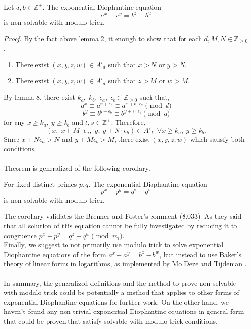 \documentclass[12pt]{article}
\begin{document}
\begin{theorem}
Let $a,b \in \mathbb{Z}^+$. The exponential Diophantine equation
    \[a^x-a^y = b^z-b^w \]
    is non-solvable with modulo trick.
\end{theorem}
\noindent
\textit{Proof}. By the fact above lemma 2, it enough to show that for each $d,M,N \in \mathbb{Z}_{\geq 0}$,
\begin{enumerate}
    \item There exist $(x,y,z,w) \in A'_d$ such that $x > N$ or $y > N$.
    \item There exist $(x,y,z,w) \in A'_d$ such that $z > M$ or $w > M$.
\end{enumerate}
By lemma 8, there exist $k_a,\;k_b,\;\epsilon_a,\;\epsilon_b \in \mathbb{Z}_{\geq 0 }$ such that,
\[a^x \equiv a^{x+\epsilon_a} \equiv a^{x+t\cdot\epsilon_a}\pmod d \]
\[b^y \equiv b^{y+\epsilon_b} \equiv b^{y+s\cdot\epsilon_b}\pmod d\]
for any $x\geq k_a, \;y\geq k_b$ and $t,s \in \mathbb{Z}^+$. Therefore,
\[(x,\;x+M\cdot\epsilon_a,\;y,\;y+N\cdot\epsilon_b) \in A'_d \;\; \forall x\geq k_a,\; y\geq k_b. \] 
Since $x+N\epsilon_a > N$ and $y+M\epsilon_b > M $, there exist $(x,y,z,w)$ which satisfy both conditions. \\\\
Theorem is generalized of the following corollary.
\begin{corollary}
 For fixed distinct primes $p,q$. The exponential Diophantine equation
    \[p^x-p^y = q^z-q^w \]
is non-solvable with modulo trick.
\end{corollary}
\noindent
\hspace*{0.5cm}The corollary validates the \cite{eDe} Brenner and Foster's comment (8.033). As they said that all solution of this equation cannot be fully investigated by reducing it to congruence $p^x-p^y = q^z-q^w \pmod {m_i}$.\\
\hspace*{0.5cm}Finally, we suggest to not primarily use modulo trick to solve exponential Diophantine equations of the form $a^x-a^y = b^z-b^w$, but instead to use Baker’s theory of linear forms in logarithms, as implemented by Mo Deze and Tijdeman \cite{DEZE199247}.
\\\\
\hspace*{0.5cm}In summary, the generalized definitions and the method to prove non-solvable with modulo trick could be potentially a method that applies to other forms of exponential Diophantine equations for further work. On the other hand, we haven't found any non-trivial exponential Diophantine equations in general form that could be proven that satisfy solvable with modulo trick conditions.
\newpage
\end{document}
